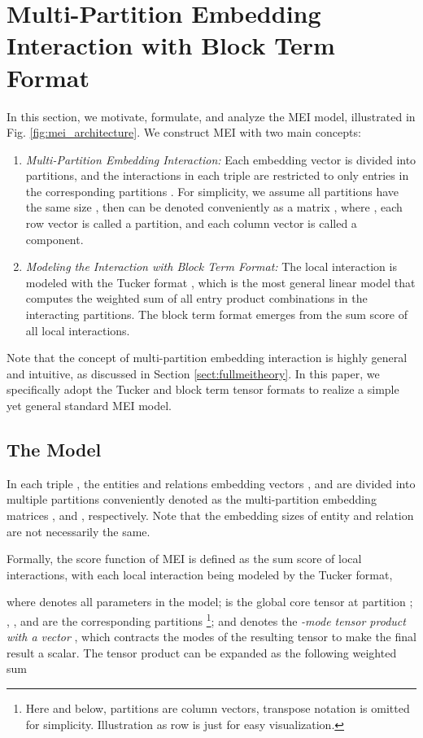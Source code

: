 \documentclass{ecai}
\theoremstyle{plain}  \newtheorem{thm}{Theorem}  \newtheorem{lem}[thm]{Lemma}  \newtheorem{prop}[thm]{Proposition}
\theoremstyle{remark}  \newtheorem*{rem}{Remark}
\begin{document}
\section{Multi-Partition Embedding Interaction with Block Term Format} \label{sect:model} In this section, we motivate, formulate, and analyze the MEI model, illustrated in Fig. \ref{fig:mei_architecture}. We construct MEI with two main concepts: 
\begin{enumerate}
	\item \textit{Multi-Partition Embedding Interaction:} Each embedding vector  is divided into  partitions, and the interactions in each triple are restricted to only entries in the corresponding partitions . For simplicity, we assume all partitions have the same size , then  can be denoted conveniently as a matrix , where , each row vector  is called a partition, and each column vector  is called a component. 

	\item \textit{Modeling the Interaction with Block Term Format:} The local interaction is modeled with the Tucker format \cite{tucker_mathematicalnotesthreemode_1966}, which is the most general linear model that computes the weighted sum of all entry product combinations in the interacting partitions. The block term format \cite{delathauwer_decompositionshigherordertensor_2008a} emerges from the sum score of all local interactions.
\end{enumerate}

Note that the concept of multi-partition embedding interaction is highly general and intuitive, as discussed in Section \ref{sect:fullmeitheory}. In this paper, we specifically adopt the Tucker and block term tensor formats to realize a simple yet general standard MEI model.

\subsection{The Model}
In each triple , the entities and relations embedding vectors , and  are divided into multiple partitions conveniently denoted as the multi-partition embedding matrices , and , respectively. Note that the embedding sizes of entity and relation are not necessarily the same. 

Formally, the score function of MEI is defined as the sum score of  local interactions, with each local interaction being modeled by the Tucker format, 

where  denotes all parameters in the model;  is the global core tensor at partition ; , , and  are the corresponding partitions  \footnote{Here and below, partitions are column vectors, transpose notation is omitted for simplicity. Illustration as row is just for easy visualization.}; and  denotes the \textit{-mode tensor product with a vector} \cite{kolda_tensordecompositionsapplications_2009}, which contracts the modes of the resulting tensor to make the final result a scalar. The tensor product can be expanded as the following weighted sum
\end{document}
